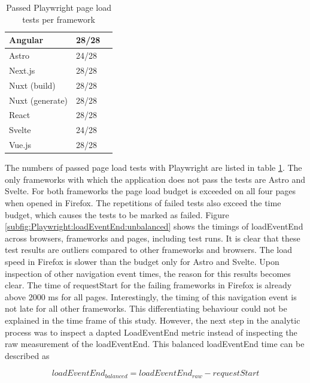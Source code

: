 \documentclass[a4paper, 12pt]{article}
\begin{document}
\begin{table}[!ht]
  \centering
  \begin{tabular}{|l|l|l|}
    \hline
    Angular         & 28/28 \\ \hline
    Astro           & 24/28 \\ \hline
    Next.js         & 28/28 \\ \hline
    Nuxt (build)    & 28/28 \\ \hline
    Nuxt (generate) & 28/28 \\ \hline
    React           & 28/28 \\ \hline
    Svelte          & 24/28 \\ \hline
    Vue.js          & 28/28 \\ \hline
  \end{tabular}
  \caption{Passed Playwright page load tests per framework}
  \label{tab:playwright:pageLoad}
\end{table}

The numbers of passed page load tests with Playwright are listed in table \ref{tab:playwright:pageLoad}.
The only frameworks with which the application does not pass the tests are Astro and Svelte.
For both frameworks the page load budget is exceeded on all four pages when opened in Firefox.
The repetitions of failed tests also exceed the time budget, which causes the tests to be marked as failed.
Figure \ref{subfig:Playwright:loadEventEnd:unbalanced} shows the timings of loadEventEnd across browsers, frameworks and pages, including test runs.
It is clear that these test results are outliers compared to other frameworks and browsers.
The load speed in Firefox is slower than the budget only for Astro and Svelte.
Upon inspection of other navigation event times, the reason for this results becomes clear.
The time of requestStart for the failing frameworks in Firefox is already above 2000 ms for all pages.
Interestingly, the timing of this navigation event is not late for all other frameworks.
This differentiating behaviour could not be explained in the time frame of this study.
However, the next step in the analytic process was to inspect a dapted LoadEventEnd metric instead of inspecting the raw measurement of the loadEventEnd.
This balanced loadEventEnd time can be described as

\begin{equation}
\mathit{loadEventEnd}_\mathit{balanced} = \mathit{loadEventEnd}_\mathit{raw} - \mathit{requestStart}
\end{equation}
\vspace{0cm}
\end{document}
